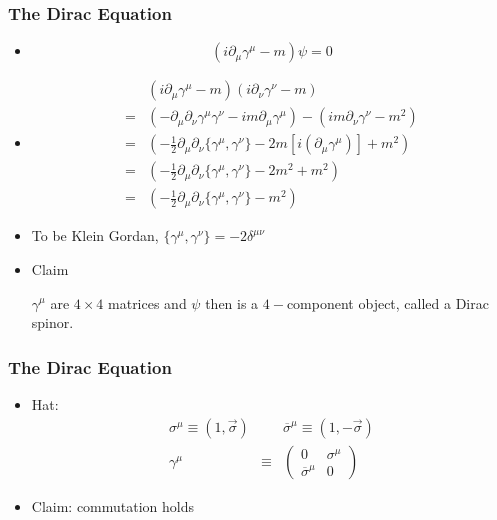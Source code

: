 \documentclass{beamer}
\begin{document}
\begin{frame}
	\frametitle{The Dirac Equation}
		\begin{itemize}
		\item 
		\[
		(i\partial_{\mu}\gamma^{\mu}-m)\psi=0
		\]

		\pause
		\item
		\[
		\begin{aligned} & (i\partial_{\mu}\gamma^{\mu}-m)(i\partial_{\nu}\gamma^{\nu}-m)\\
		= & (-\partial_{\mu}\partial_{\nu}\gamma^{\mu}\gamma^{\nu}-im\partial_{\mu}\gamma^{\mu})-(im\partial_{\nu}\gamma^{\nu}-m^{2})\\
		= & (-\frac{1}{2}\partial_{\mu}\partial_{\nu}\{\gamma^{\mu},\gamma^{\nu}\}-2m\left[i(\partial_{\mu}\gamma^{\mu})\right]+m^{2})\\
		= & (-\frac{1}{2}\partial_{\mu}\partial_{\nu}\{\gamma^{\mu},\gamma^{\nu}\}-2m^{2}+m^{2})\\
		= & (-\frac{1}{2}\partial_{\mu}\partial_{\nu}\{\gamma^{\mu},\gamma^{\nu}\}-m^{2})
		\end{aligned}
		\]


		\pause 
		\item 

		To be Klein Gordan, $\{\gamma^{\mu},\gamma^{\nu}\}=-2\delta^{\mu\nu}$

		\pause
		\item Claim

		$\gamma^{\mu}$ are $4\times4$ matrices and $\psi$ then is a $4-$component object, called a Dirac spinor.

	\end{itemize}
\end{frame}

\begin{frame}
	\frametitle{The Dirac Equation}
\begin{itemize}
	\item 
	Hat:
	\[
	\begin{aligned}\sigma^{\mu}\equiv(1,\vec{\sigma}) &  & \overline{\sigma}^{\mu}\equiv(1,-\vec{\sigma})\\
	\gamma^{\mu} & \equiv & \left(\begin{array}{cc}
	0 & \sigma^{\mu}\\
	\overline{\sigma}^{\mu} & 0
	\end{array}\right)
	\end{aligned}
	\]
	\pause
	\item Claim: commutation holds
\end{itemize}

\end{frame}
\end{document}
